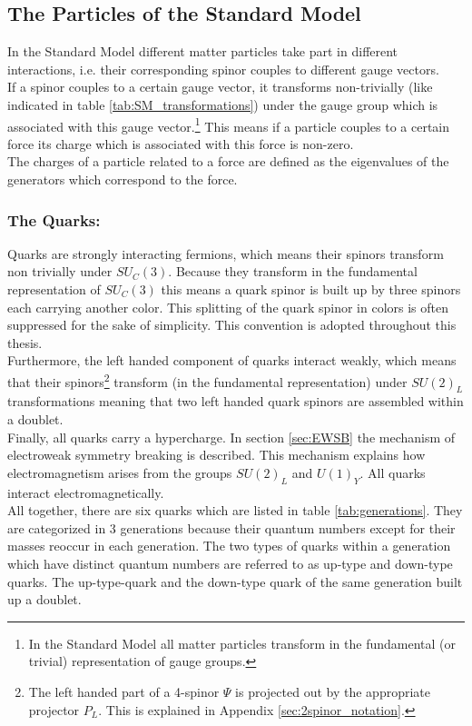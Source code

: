 \subsection{The Particles of the Standard Model}
In the Standard Model different matter particles take part in different interactions, i.e. their corresponding spinor couples to different gauge vectors.\\
If a spinor couples to a certain gauge vector, it transforms  non-trivially (like indicated in table \ref{tab:SM_transformations}) under the gauge group which is associated with this gauge vector.\footnote{In the Standard Model all matter particles transform in the fundamental (or trivial) representation of gauge groups.} This means if a particle couples to a certain force its charge which is associated with this force is non-zero.\\
The charges of a particle related to a force are defined as the eigenvalues of the generators which correspond to the force.
\subsubsection*{The Quarks:}
Quarks are strongly interacting fermions, which means their spinors transform non trivially under $SU_C(3)$. Because they transform in the fundamental representation of $SU_C(3)$ this means a quark spinor is built up by three spinors each carrying another color. This splitting of the quark spinor in colors is often suppressed for the sake of simplicity. This convention is adopted throughout this thesis.\\
Furthermore, the left handed component of quarks interact weakly, which means that their spinors\footnote{The left handed part of a 4-spinor $\Psi$ is projected out by the appropriate projector $P_L$. This is explained in Appendix \ref{sec:2spinor_notation}.} transform (in the fundamental representation) under $SU(2)_L$ transformations meaning that two left handed quark spinors are assembled within a doublet.\\
Finally, all quarks carry a hypercharge. In section \ref{sec:EWSB} the mechanism of electroweak symmetry breaking is described. This mechanism explains how electromagnetism arises from the groups $SU(2)_L$ and $U(1)_Y$. All quarks interact electromagnetically.\\
All together, there are six quarks which are listed in table \ref{tab:generations}. They are categorized in 3 generations because their quantum numbers except for their masses reoccur in each generation. The two types of quarks within a generation which have distinct quantum numbers are referred to as up-type and down-type quarks. The up-type-quark and the down-type quark of the same generation built up a doublet.
